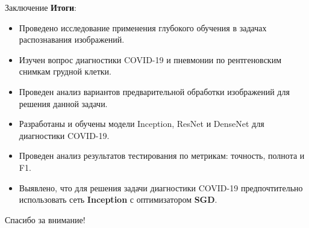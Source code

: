 \documentclass[aspectratio=169]{beamer}
\begin{document}
\begin{frame}{Заключение}
    \textbf{Итоги}:\\
    \begin{itemize}
        \item Проведено исследование применения глубокого обучения в задачах распознавания изображений.
        \item Изучен вопрос диагностики COVID-19 и пневмонии по рентгеновским снимкам грудной клетки.
        \item Проведен анализ вариантов предварительной обработки изображений для решения данной задачи. 
        \item Разработаны и обучены модели Inception, ResNet и DenseNet для диагностики COVID-19.
        \item Проведен анализ результатов тестирования по метрикам: точность, полнота и F1.
        \item Выявлено, что для решения задачи диагностики COVID-19 предпочтительно использовать сеть \textbf{Inception} с оптимизатором \textbf{SGD}.
    \end{itemize}
\end{frame}
\begin{frame}
    \centering\Huge
    Спасибо за внимание!
\end{frame}
\end{document}
